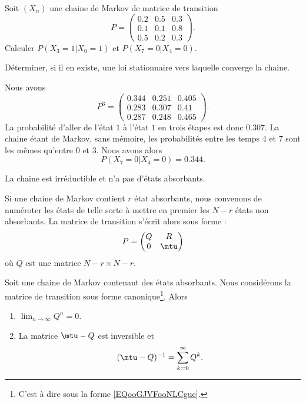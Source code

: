 \begin{example}
	Soit \( (X_n)\) une chaine de Markov de matrice de transition
	\begin{equation}
		P=\begin{pmatrix}
			0.2 & 0.5 & 0.3 \\
			0.1 & 0.1 & 0.8 \\
			0.5 & 0.2 & 0.3
		\end{pmatrix}.
	\end{equation}
	Calculer \( P(X_3=1|X_0=1)\) et \( P(X_7=0|X_4=0)\).

	Déterminer, si il en existe, une loi stationnaire vers laquelle converge la chaine.

	Nous avons
	\begin{equation}
		P^3=\begin{pmatrix}
			0.344 & 0.251 & 0.405 \\
			0.283 & 0.307 & 0.41  \\
			0.287 & 0.248 & 0.465
		\end{pmatrix}.
	\end{equation}
	La probabilité d'aller de l'état \( 1\) à l'état \( 1\) en trois étapes est donc \( 0.307\). La chaine étant de Markov, sans mémoire, les probabilités entre les temps \( 4\) et \( 7\) sont les mêmes qu'entre \( 0\) et \( 3\). Nous avons alors
	\begin{equation}
		P(X_7=0|X_4=0)=0.344.
	\end{equation}

	La chaine est irréductible et n'a pas d'états absorbants.
\end{example}

Si une chaine de Markov contient \( r\) état absorbants, nous convenons de numéroter les états de telle sorte à mettre en premier les \( N-r\) états non absorbants. La matrice de transition s'écrit alors sous forme  :
\begin{equation}        \label{EQooGJVFooNLCgue}
	P=\begin{pmatrix}
		Q & R    \\
		0 & \mtu
	\end{pmatrix}
\end{equation}
où \( Q\) est une matrice \( N-r\times N-r\).

\begin{proposition}     \label{PROPooUNBDooVhXZxi}
	Soit une chaine de Markov contenant des états absorbants. Nous considérons la matrice de transition sous forme canonique\footnote{C'est à dire sous la forme \eqref{EQooGJVFooNLCgue}.}. Alors
	\begin{enumerate}
		\item
		      \( \lim_{n\to \infty} Q^n=0\).
		\item
		      La matrice \( \mtu-Q\) est inversible et
		      \begin{equation}
			      (\mtu-Q)^{-1}=\sum_{k=0}^{\infty}Q^k.
		      \end{equation}
	\end{enumerate}
\end{proposition}

